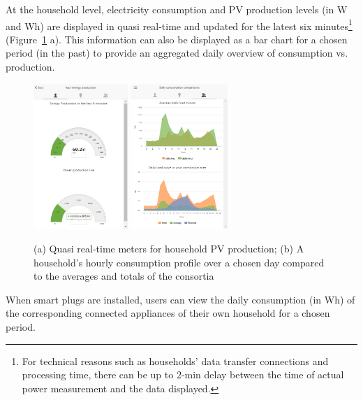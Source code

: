 At the household level, electricity consumption and PV production levels (in W and Wh) are displayed in quasi real-time and updated for the latest six minutes\footnote{For technical reasons such as households' data transfer connections and processing time, there can be up to 2-min delay between the time of actual power measurement and the data displayed.} (Figure~\ref{fig:viz_rt} a).
This information can also be displayed as a bar chart for a chosen period (in the past) to provide an aggregated daily overview of consumption vs. production. %
\begin{figure}[b]
\sidecaption[t]
        \includegraphics[height=5.5cm]{img/visual_production.png}	         \includegraphics[height=5.5cm]{img/benchmark.png}
    \caption{(a) Quasi real-time meters for household PV production;  (b) 
          A household's hourly consumption profile over a chosen day compared to the averages and totals of the consortia}
\label{fig:viz_rt}
\end{figure}
%
When smart plugs are installed, users can view the daily consumption (in Wh) of the corresponding connected appliances of their own household for a chosen period. %
